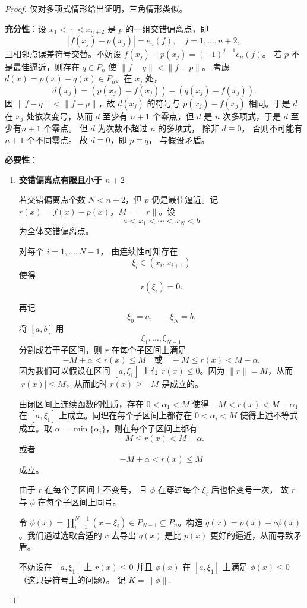 \begin{proof}
仅对多项式情形给出证明，三角情形类似。

\textbf{充分性}：设 $x_1<\cdots<x_{n+2}$ 是 $p$ 的一组交错偏离点，即
\[
|f(x_j)-p(x_j)| = e_n(f),\quad j=1,\dots,n+2,
\]
且相邻点误差符号交替。不妨设 $f(x_j)-p(x_j) = (-1)^{j-1}e_n(f)$。
若 $p$ 不是最佳逼近，则存在 $q\in P_n$ 使 $\|f-q\| < \|f-p\|$。
考虑 $d(x)=p(x)-q(x)\in P_n$。在 $x_j$ 处，
\[
d(x_j) = (p(x_j)-f(x_j)) - (q(x_j)-f(x_j)).
\]
因 $\|f-q\|<\|f-p\|$，故 $d(x_j)$ 的符号与 $p(x_j)-f(x_j)$ 相同。于是 $d$ 在 $x_j$ 处依次变号，从而 $d$ 至少有 $n+1$ 个零点，但 $d$ 是 $n$ 次多项式，于是 $d$ 至少有$ n+1$ 个零点。
但 $d$ 为次数不超过 $n$ 的多项式，
除非 $d\equiv0$，
否则不可能有 $n+1$ 个不同零点。
故 $d\equiv0$，即 $p\equiv q$，
与假设矛盾。

\textbf{必要性}：
\begin{enumerate}
    \item \textbf{交错偏离点有限且小于 $n+2$} 

若交错偏离点个数 $N < n+2$，但 $p$ 仍是最佳逼近。记 $r(x)=f(x)-p(x)$，$M=\|r\|$。设
\[
a<x_1<\cdots<x_N<b
\]
为全体交错偏离点。

对每个 $i=1,\dots,N-1$，
由连续性可知存在
\[
\xi_i\in(x_i,x_{i+1})
\]
使得
\[
r(\xi_i)=0.
\]

再记
\[
\xi_0=a,\qquad \xi_N=b.
\]将 $[a,b]$ 用 $$\xi_1,\dots,\xi_{N-1}$$ 分割成若干子区间，则 $r$ 在每个子区间上满足
\[
-M+\alpha < r(x)  \leqslant M \quad\text{或}\quad -M  \leqslant r(x) < M-\alpha.
\]
因为我们可以假设在区间 $[a, \xi_1]$ 上有 $r(x)  \leqslant 0$。因为 $\|r\| = M$，从而 $|r(x)|  \leqslant  M$，从而此时 $r(x) \geqslant -M$ 是成立的。

由闭区间上连续函数的性质，存在 $0 < \alpha_1 < M $ 使得 $-M < r(x) < M -\alpha_1$ 在 $[a, \xi_1]$ 上成立。同理在每个子区间上都存在 $ 0 < \alpha_i < M $ 使得上述不等式成立。取 $\alpha = \min\{\alpha_i\}$，则在每个子区间上都有
\[-M   \leqslant  r(x) < M - \alpha.
\]或者
\[-M + \alpha < r(x)  \leqslant  M \]成立。

由于 $r$ 在每个子区间上不变号，
且 $\phi$ 在穿过每个 $\xi_i$ 后也恰变号一次，
故 $r$ 与 $\phi$ 在每个子区间上同号。

令 $\phi(x) = \prod_{i=1}^{N-1}(x-\xi_i)\in P_{N-1}\subseteq P_n$。构造 $q(x)=p(x)+c\phi(x)$。我们通过选取合适的 $c$ 去导出 $q(x)$ 是比 $p(x)$ 更好的逼近，从而导致矛盾。

不妨设在 $[a, \xi_1]$ 上 $r(x) \leqslant  0$ 并且 $\phi(x)$ 在 $[a, \xi_1]$ 上满足 $\phi(x)  \leqslant  0$（这只是符号上的问题）。
记 $K = \|\phi\|$.


\end{enumerate}
\end{proof}
